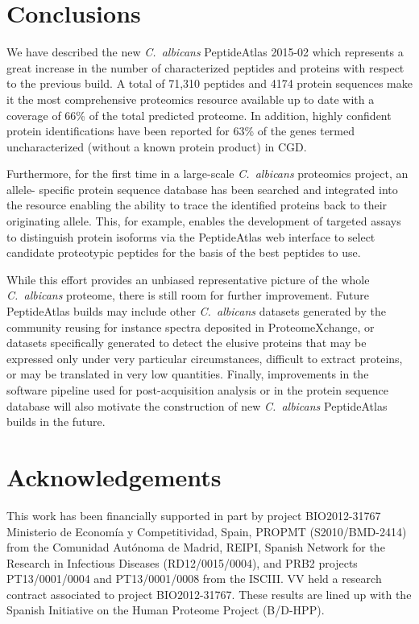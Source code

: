\section*{Conclusions}

We have described the new \textit{\mbox{C. albicans}} PeptideAtlas 2015-02 which represents a great
increase in the number of characterized peptides and proteins with respect to the previous
build. A total of 71,310 peptides and 4174 protein sequences make it the most
comprehensive proteomics resource available up to date with a coverage of 66\% of the total
predicted proteome. In addition, highly confident protein identifications have been reported
for 63\% of the genes termed uncharacterized (without a known protein product) in CGD.

Furthermore, for the first time in a large-scale \textit{\mbox{C. albicans}} proteomics project, an allele-
specific protein sequence database has been searched and integrated into the resource
enabling the ability to trace the identified proteins back to their originating allele. This, for
example, enables the development of targeted assays to distinguish protein isoforms via the
PeptideAtlas web interface \citep{Farrah2011} to select candidate proteotypic peptides for the basis of the
best peptides to use.

While this effort provides an unbiased representative picture of the whole \textit{\mbox{C. albicans}}
proteome, there is still room for further improvement. Future PeptideAtlas builds may include other \textit{\mbox{C. albicans}}
datasets generated by the community reusing for instance spectra deposited in ProteomeXchange,
or datasets specifically generated to detect the elusive proteins that may be expressed only
under very particular circumstances, difficult to extract proteins, or may be translated in very
low quantities. Finally, improvements in the software pipeline used for post-acquisition
analysis or in the protein sequence database will also motivate the construction of new
\textit{\mbox{C. albicans}} PeptideAtlas builds in the future.


\section*{Acknowledgements}

This work has been financially supported in part by project BIO2012-31767 
Ministerio de Econom\'ia y Competitividad, Spain, PROPMT (S2010/BMD-2414)
from the Comunidad Aut\'onoma de Madrid, REIPI, Spanish Network for the
Research in Infectious Diseases \linebreak (RD12/0015/0004), and PRB2 projects PT13/0001/0004 
and PT13/0001/0008 from the ISCIII. VV held a research contract associated to project BIO2012-31767.
These results are lined up with the Spanish Initiative on the Human Proteome Project (B/D-HPP).

